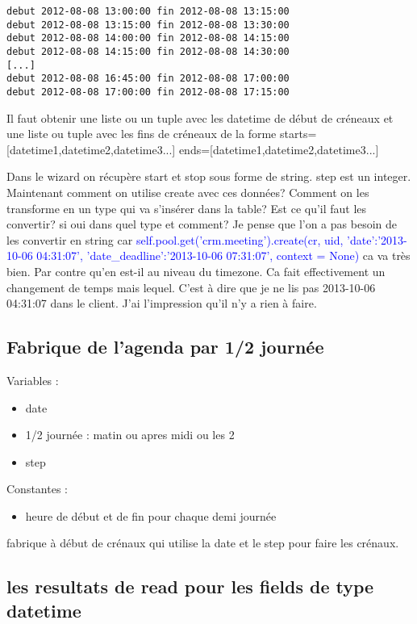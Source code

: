 \documentclass[12pt,a4paper]{article}
\begin{document}
\begin{verbatim}
debut 2012-08-08 13:00:00 fin 2012-08-08 13:15:00
debut 2012-08-08 13:15:00 fin 2012-08-08 13:30:00
debut 2012-08-08 14:00:00 fin 2012-08-08 14:15:00
debut 2012-08-08 14:15:00 fin 2012-08-08 14:30:00
[...]
debut 2012-08-08 16:45:00 fin 2012-08-08 17:00:00
debut 2012-08-08 17:00:00 fin 2012-08-08 17:15:00
\end{verbatim}

Il faut obtenir une liste ou un tuple avec les datetime de début de créneaux et une liste ou tuple avec les fins de créneaux de la forme
starts=[datetime1,datetime2,datetime3...] ends=[datetime1,datetime2,datetime3...]

Dans le wizard on récupère start et stop sous forme  de string. step est un integer. 
Maintenant comment on utilise create avec ces données? Comment on les transforme en un type qui va s'insérer dans la table?
Est ce qu'il faut les convertir? si oui dans quel type et comment?
Je pense que l'on a pas besoin de les convertir en string car \textcolor{blue}{self.pool.get('crm.meeting').create(cr, uid, {'date':'2013-10-06 04:31:07', 'date\_deadline':'2013-10-06 07:31:07'}, context = None)}
ca va très bien. Par contre qu'en est-il au niveau du timezone. Ca fait effectivement un changement de temps mais lequel. C'est à dire que je ne lis pas 2013-10-06 04:31:07 dans le client.
J'ai l'impression qu'il n'y a rien à faire.


\subsection{ Fabrique de l’agenda par 1/2 journée}
\label{sec:halfday}


Variables :
\begin{itemize}
\item date
\item 1/2 journée : matin ou apres midi ou les 2
\item step
\end{itemize}

Constantes :
\begin{itemize}
\item heure de début et de fin pour chaque demi journée
\end{itemize}

fabrique à début de crénaux qui utilise la date et le step pour faire les crénaux.



\subsection{les resultats de read pour les fields de type datetime}
\label{sec:read}
\end{document}
